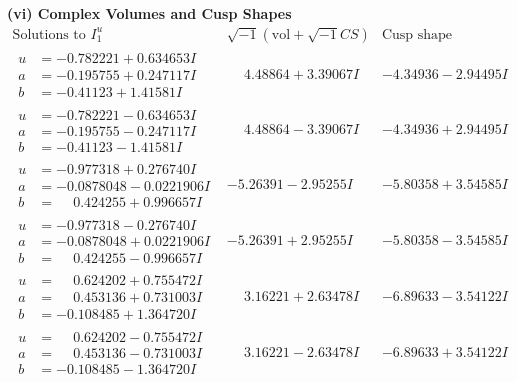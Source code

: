 \documentclass[1p]{elsarticle_modified}
\theoremstyle{definition}
\newcommand{\I}{\sqrt{-1}}
\begin{document}
\newpage\flushleft \textbf{(vi) Complex Volumes and Cusp Shapes}
$$\begin{array}{c|c|c}  
\text{Solutions to }I^u_{1}& \I (\text{vol} + \sqrt{-1}CS) & \text{Cusp shape}\\
 \hline 
\begin{aligned}
u &= -0.782221 + 0.634653 I \\
a &= -0.195755 + 0.247117 I \\
b &= -0.41123 + 1.41581 I\end{aligned}
 & \phantom{-}4.48864 + 3.39067 I & -4.34936 - 2.94495 I \\ \hline\begin{aligned}
u &= -0.782221 - 0.634653 I \\
a &= -0.195755 - 0.247117 I \\
b &= -0.41123 - 1.41581 I\end{aligned}
 & \phantom{-}4.48864 - 3.39067 I & -4.34936 + 2.94495 I \\ \hline\begin{aligned}
u &= -0.977318 + 0.276740 I \\
a &= -0.0878048 - 0.0221906 I \\
b &= \phantom{-}0.424255 + 0.996657 I\end{aligned}
 & -5.26391 - 2.95255 I & -5.80358 + 3.54585 I \\ \hline\begin{aligned}
u &= -0.977318 - 0.276740 I \\
a &= -0.0878048 + 0.0221906 I \\
b &= \phantom{-}0.424255 - 0.996657 I\end{aligned}
 & -5.26391 + 2.95255 I & -5.80358 - 3.54585 I \\ \hline\begin{aligned}
u &= \phantom{-}0.624202 + 0.755472 I \\
a &= \phantom{-}0.453136 + 0.731003 I \\
b &= -0.108485 + 1.364720 I\end{aligned}
 & \phantom{-}3.16221 + 2.63478 I & -6.89633 - 3.54122 I \\ \hline\begin{aligned}
u &= \phantom{-}0.624202 - 0.755472 I \\
a &= \phantom{-}0.453136 - 0.731003 I \\
b &= -0.108485 - 1.364720 I\end{aligned}
 & \phantom{-}3.16221 - 2.63478 I & -6.89633 + 3.54122 I \\ \hline\begin{aligned}

\end{aligned}
\end{array}$$
\end{document}
